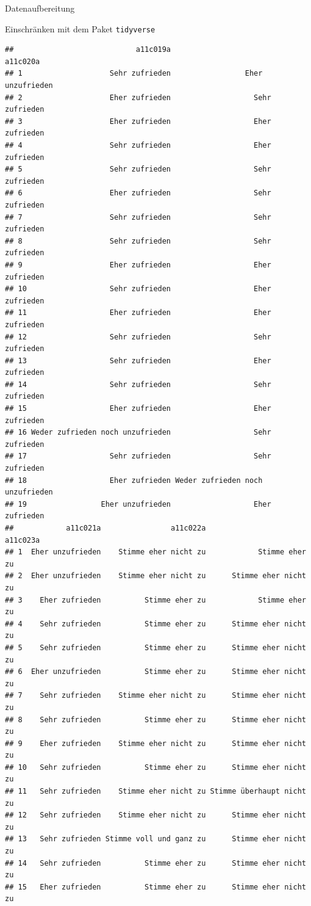 \documentclass[ignorenonframetext,]{beamer}
\begin{document}
\begin{frame}[fragile]{Datenaufbereitung}
\begin{block}{Einschränken mit dem Paket \texttt{tidyverse}}
\begin{verbatim}
##                            a11c019a                         a11c020a
## 1                    Sehr zufrieden                 Eher unzufrieden
## 2                    Eher zufrieden                   Sehr zufrieden
## 3                    Eher zufrieden                   Eher zufrieden
## 4                    Sehr zufrieden                   Eher zufrieden
## 5                    Sehr zufrieden                   Sehr zufrieden
## 6                    Eher zufrieden                   Sehr zufrieden
## 7                    Sehr zufrieden                   Sehr zufrieden
## 8                    Sehr zufrieden                   Sehr zufrieden
## 9                    Eher zufrieden                   Eher zufrieden
## 10                   Sehr zufrieden                   Eher zufrieden
## 11                   Eher zufrieden                   Eher zufrieden
## 12                   Sehr zufrieden                   Sehr zufrieden
## 13                   Sehr zufrieden                   Eher zufrieden
## 14                   Sehr zufrieden                   Sehr zufrieden
## 15                   Eher zufrieden                   Eher zufrieden
## 16 Weder zufrieden noch unzufrieden                   Sehr zufrieden
## 17                   Sehr zufrieden                   Sehr zufrieden
## 18                   Eher zufrieden Weder zufrieden noch unzufrieden
## 19                 Eher unzufrieden                   Eher zufrieden
##            a11c021a                a11c022a                  a11c023a
## 1  Eher unzufrieden    Stimme eher nicht zu            Stimme eher zu
## 2  Eher unzufrieden    Stimme eher nicht zu      Stimme eher nicht zu
## 3    Eher zufrieden          Stimme eher zu            Stimme eher zu
## 4    Sehr zufrieden          Stimme eher zu      Stimme eher nicht zu
## 5    Sehr zufrieden          Stimme eher zu      Stimme eher nicht zu
## 6  Eher unzufrieden          Stimme eher zu      Stimme eher nicht zu
## 7    Sehr zufrieden    Stimme eher nicht zu      Stimme eher nicht zu
## 8    Sehr zufrieden          Stimme eher zu      Stimme eher nicht zu
## 9    Eher zufrieden    Stimme eher nicht zu      Stimme eher nicht zu
## 10   Sehr zufrieden          Stimme eher zu      Stimme eher nicht zu
## 11   Sehr zufrieden    Stimme eher nicht zu Stimme überhaupt nicht zu
## 12   Sehr zufrieden    Stimme eher nicht zu      Stimme eher nicht zu
## 13   Sehr zufrieden Stimme voll und ganz zu      Stimme eher nicht zu
## 14   Sehr zufrieden          Stimme eher zu      Stimme eher nicht zu
## 15   Eher zufrieden          Stimme eher zu      Stimme eher nicht zu

\end{verbatim}
\end{block}
\end{frame}
\end{document}
